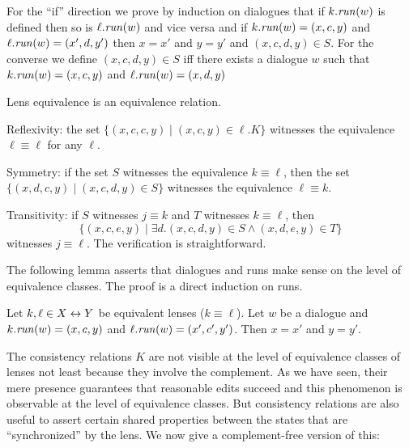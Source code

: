 \iffull
\begin{pf}
  For the ``if'' direction we prove by induction on dialogues that if
  $k.\mathit{run}(w)$ is defined then so is $\ell.\mathit{run}(w)$ and vice versa and
  if $k.\mathit{run}(w)=(x,c,y)$ and $\ell.\mathit{run}(w)=(x',d,y')$ then $x=x'$ and
  $y=y'$ and $(x,c,d,y)\in S$. For the converse we define
  $(x,c,d,y)\in S$ iff there exists a dialogue $w$ such that
  $k.\mathit{run}(w)=(x,c,y)$ and $\ell.\mathit{run}(w)=(x,d,y)$ 
\end{pf}

\begin{theorem}
    Lens equivalence is an equivalence relation.
\end{theorem}
\begin{pf}
    Reflexivity: the set $\{(x,c,c,y) \mid (x,c,y) \in \ell.K\}$ witnesses the
    equivalence $\ell\equiv\ell$ for any $\ell$.

    Symmetry: if the set $S$ witnesses the equivalence $k\equiv\ell$, then
    the set $\{(x,d,c,y) \mid (x,c,d,y) \in S\}$ witnesses the equivalence
    $\ell \equiv k$.

    Transitivity: if $S$ witnesses $j \equiv k$ and $T$ witnesses
    $k\equiv\ell$, then
    \[\{(x,c,e,y) \mid \exists d. (x,c,d,y) \in S \land (x,d,e,y) \in T\}\]
    witnesses $j\equiv\ell$. The verification is straightforward.
\end{pf}
\fi

\iffull
\iflater
{}The
following lemma asserts that dialogues and runs make sense on the level of
equivalence classes. The proof is a direct induction on runs.
\begin{lemma}
Let $k,\ell \in X\leftrightarrow Y$ be equivalent lenses ($k\equiv \ell$). Let $w$
be a dialogue and $k.\mathit{run}(w)=(x,c,y)$ and
$\ell.\mathit{run}(w)=(x',c',y')$. Then $x=x'$ and $y=y'$. 
\end{lemma}

The consistency relations $K$ are not visible at the level
of equivalence classes of lenses not least because they involve the
complement. As we have seen, their mere presence guarantees that reasonable
edits succeed and this phenomenon is observable at the level of equivalence
classes. But consistency relations are also useful to assert certain shared
properties between the states that are ``synchronized'' by the lens. We now
give a complement-free version of this:

